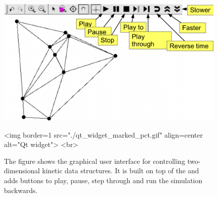 \begin{figure}
\begin{ccTexOnly}
\begin{center}
\includegraphics[scale=.5]{Kinetic_data_structures/qt_widget_marked_pct}
\end{center}
\end{ccTexOnly}
\begin{ccHtmlOnly}
<img border=1 src="./qt_widget_marked_pct.gif" align=center alt="Qt widget"> <br>
\end{ccHtmlOnly}
\caption{\label{qtwidget_capture} The figure shows the graphical user interface for
  controlling two-dimensional kinetic data structures. It is built on
  top of the  and adds buttons to play, pause, step
  through and run the simulation backwards.}
\end{figure}
